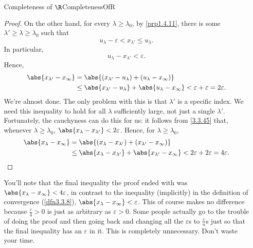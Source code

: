 \begin{thm}{Completeness of $\R$}{CompletenessOfR}
\begin{proof}
On the other hand, for every $\lambda \geq \lambda _0$, by \cref{prp1.4.11}, there is some $\lambda '\geq \lambda \geq \lambda _0$ such that
\begin{equation}
u_\lambda -\varepsilon <x_{\lambda '}\leq u_\lambda .
\end{equation}
In particular,
\begin{equation}
u_\lambda -x_{\lambda '}<\varepsilon .
\end{equation}
Hence,
\begin{equation}
\begin{split}
\abs{x_{\lambda '}-x_\infty} & =\abs{(x_{\lambda '}-u_\lambda )+(u_\lambda -x_\infty )} \\
& \leq \abs{x_{\lambda '}-u_\lambda}+\abs{u_\lambda -x_\infty}<\varepsilon +\varepsilon =2\varepsilon .
\end{split}
\end{equation}
We're almost done.  The only problem with this is that $\lambda '$ is a specific index.  We need this inequality to hold for all $\lambda$ sufficiently large, not just a single $\lambda '$.  Fortunately, the cauchyness can do this for us:  it follows from \eqref{3.3.45} that, whenever $\lambda \geq \lambda _0$, $\abs{x_\lambda -x_{\lambda '}}<2\varepsilon$.  Hence, for $\lambda \geq \lambda _0$,
\begin{equation}
\begin{split}
\abs{x_\lambda -x_\infty} & =\abs{(x_\lambda -x_{\lambda '})+(x_{\lambda '}-x_\infty)} \\
& \leq \abs{x_\lambda -x_{\lambda '}}+\abs{x_{\lambda '}-x_\infty}<2\varepsilon +2\varepsilon =4\varepsilon .
\end{split}
\end{equation}
\end{proof}
\begin{rmk}
You'll note that the final inequality the proof ended with was $\abs{x_\lambda -x_\infty}<4\varepsilon$, in contrast to the inequality (implicitly) in the definition of convergence (\cref{dfn3.3.8}), $\abs{x_\lambda -x_\infty}<\varepsilon$.  This of course makes no difference because $\frac{\varepsilon}{4}>0$ is just as arbitrary as $\varepsilon>0$.  Some people actually go to the trouble of doing the proof and then going back and changing all the $\varepsilon$s to $\frac{\varepsilon}{n}$s just so that the final inequality has an $\varepsilon$ in it.  This is completely unnecessary.  Don't waste your time.
\end{rmk}
\end{thm}

